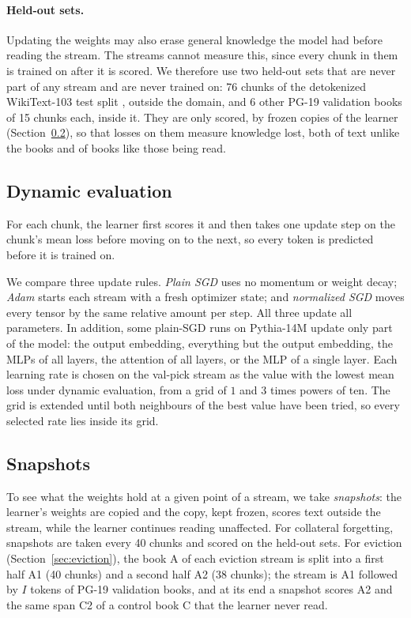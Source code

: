 \documentclass[10pt]{article}
\begin{document}
\paragraph{Held-out sets.}
Updating the weights may also erase general knowledge the model had before reading the stream.
The streams cannot measure this, since every chunk in them is trained on after it is scored.
We therefore use two held-out sets that are never part of any stream and are never trained on: 76 chunks of the detokenized WikiText-103 test split \cite{merity2017pointer}, outside the domain, and 6 other PG-19 validation books of 15 chunks each, inside it.
They are only scored, by frozen copies of the learner (Section~\ref{sec:snapshots}), so that losses on them measure knowledge lost, both of text unlike the books and of books like those being read.

\subsection{Dynamic evaluation}

For each chunk, the learner first scores it and then takes one update step on the chunk's mean loss before moving on to the next, so every token is predicted before it is trained on.

We compare three update rules.
\emph{Plain SGD} uses no momentum or weight decay; \emph{Adam} \cite{kingma2015adam} starts each stream with a fresh optimizer state; and \emph{normalized SGD} moves every tensor by the same relative amount per step.
All three update all parameters.
In addition, some plain-SGD runs on Pythia-14M update only part of the model: the output embedding, everything but the output embedding, the MLPs of all layers, the attention of all layers, or the MLP of a single layer.
Each learning rate is chosen on the val-pick stream as the value with the lowest mean loss under dynamic evaluation, from a grid of $1$ and $3$ times powers of ten.
The grid is extended until both neighbours of the best value have been tried, so every selected rate lies inside its grid.

\subsection{Snapshots}\label{sec:snapshots}

To see what the weights hold at a given point of a stream, we take \emph{snapshots}: the learner's weights are copied and the copy, kept frozen, scores text outside the stream, while the learner continues reading unaffected.
For collateral forgetting, snapshots are taken every 40 chunks and scored on the held-out sets.
For eviction (Section~\ref{sec:eviction}), the book A of each eviction stream is split into a first half A1 (40 chunks) and a second half A2 (38 chunks); the stream is A1 followed by $I$ tokens of PG-19 validation books, and at its end a snapshot scores A2 and the same span C2 of a control book C that the learner never read.
\end{document}
